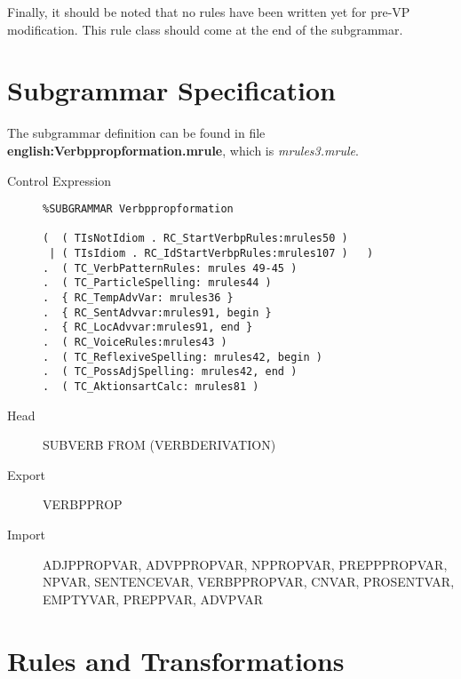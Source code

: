 Finally, it should be noted that no rules have been written yet for pre-VP 
modification. This rule class should come at the end of the subgrammar.


\newpage
\section{Subgrammar Specification}
The subgrammar definition can be found in file 
{\bf english:Verbppropformation.mrule}, which is {\em mrules3.mrule\/}.

\begin{description}
\item[Control Expression] \mbox{}
\begin{verbatim}
%SUBGRAMMAR Verbppropformation

(  ( TIsNotIdiom . RC_StartVerbpRules:mrules50 )  
 | ( TIsIdiom . RC_IdStartVerbpRules:mrules107 )   )
.  ( TC_VerbPatternRules: mrules 49-45 )
.  ( TC_ParticleSpelling: mrules44 )
.  { RC_TempAdvVar: mrules36 }
.  { RC_SentAdvvar:mrules91, begin }
.  { RC_LocAdvvar:mrules91, end }
.  ( RC_VoiceRules:mrules43 )
.  ( TC_ReflexiveSpelling: mrules42, begin )
.  ( TC_PossAdjSpelling: mrules42, end )
.  ( TC_AktionsartCalc: mrules81 )

\end{verbatim}

  \item[Head]  SUBVERB FROM (VERBDERIVATION)
  \item[Export]  VERBPPROP 
  \item[Import] ADJPPROPVAR, ADVPPROPVAR, NPPROPVAR, PREPPPROPVAR, 
                NPVAR, SENTENCEVAR, VERBPPROPVAR, CNVAR, PROSENTVAR,
                EMPTYVAR, PREPPVAR, ADVPVAR 
\end{description}

\newpage
\section{Rules and Transformations}
